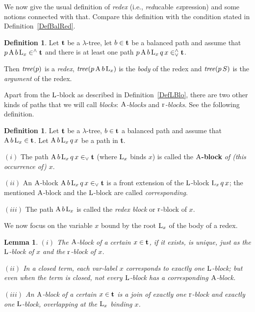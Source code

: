 \documentclass{article}
\theoremstyle{plain}
\newtheorem{Lem}[The]{Lemma}
\theoremstyle{definition}
\newtheorem{Def}[The]{Definition}
\begin{document}
\smallskip

We now give the usual definition of {\em redex\/} (i.e., {\em red\/}ucable {\em ex\/}pression) and some notions connected with that. Compare this definition with the condition stated in Definition~\ref{DefBalRed}.

\begin{Def}\label{DefRedExp}
Let ${\bf t}$ be a $\lambda$-tree, let $b \in {\bf t}$ be a balanced path and assume that $p \, {\rm A} \, b \, {\rm L}_x \in^\wedge {\bf t}$ and there is at least one path $p \, {\rm A} \, b \, {\rm L}_x \, q \, x \in^\wedge_\vee {\bf t}$.

Then ${\it tree}(p)$ is a {\em redex\/}, ${\it tree}(p \, {\rm A} \, b \, {\rm L}_x)$ is the {\em body\/} of the redex and ${\it tree}(p \, S)$ is the {\em argument\/} of the redex.
\end{Def}

Apart from the ${\rm L}$-block as described in Definition~\ref{DefLBlo}, there are two other kinds of paths that we will call {\em blocks}: {\em ${\rm A}$-blocks\/} and {\em ${\rm r}$-blocks}. See the following definition.

\begin{Def}\label{DefABlo}
Let ${\bf t}$ be a $\lambda$-tree, $b \in {\bf t}$ a balanced path and assume that ${\rm A} \, b \, {\rm L}_x \in {\bf t}$. Let ${\rm A} \, b \, {\rm L}_x \, q \, x$ be a path in {\bf t}.

$(i)$ The path ${\rm A} \, b \, {\rm L}_x \, q \, x \in_\vee {\bf t}$ (where ${\rm L}_x$ binds $x$) is called the {\bf ${\rm A}$-block} {\em of (this occurrence of) $x$}.

$(ii)$ An ${\rm A}$-block ${\rm A} \, b \, {\rm L}_x \, q \, x \in_\vee {\bf t}$ is a front extension of the ${\rm L}$-block ${\rm L}_x \, q \, x$; the mentioned ${\rm A}$-block and the ${\rm L}$-block are called {\em corresponding\/}.

$(iii)$ The path ${\rm A} \, b \, {\rm L}_x$ is called the {\em redex block\/} or ${\rm r}$-block of $x$.
\end{Def}

We now focus on the variable $x$ bound by the root ${\rm L}_x$ of the body of a redex.


\begin{Lem}\label{LemALblo} $(i)$ The ${\rm A}$-block of a certain $x \in {\bf t}$, if it exists, is unique, just as the ${\rm L}$-block of $x$ and the ${\rm r}$-block of $x$.

$(ii)$ In a closed term, each var-label $x$ corresponds to exactly one ${\rm L}$-block; but even when the term is closed, not every ${\rm L}$-block has a corresponding ${\rm A}$-block.

$(iii)$ An ${\rm A}$-block of a certain $x \in {\bf t}$ is a join of exactly one ${\rm r}$-block and exactly one ${\rm L}$-block, {\it overlapping\/} at the ${\rm L}_x$ binding $x$.

\end{Lem}
\end{document}
